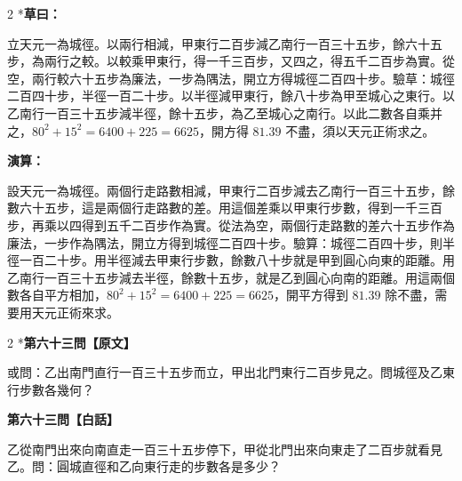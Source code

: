 \documentclass[11pt,a4paper]{article}
\begin{document}
\begin{paracol}{2}
\switchcolumn[0]*\textbf{草曰：}

\small 立天元一為城徑。以兩行相減，甲東行二百步減乙南行一百三十五步，餘六十五步，為兩行之較。以較乘甲東行，得一千三百步，又四之，得五千二百步為實。從空，兩行較六十五步為廉法，一步為隅法，開立方得城徑二百四十步。驗草：城徑二百四十步，半徑一百二十步。以半徑減甲東行，餘八十步為甲至城心之東行。以乙南行一百三十五步減半徑，餘十五步，為乙至城心之南行。以此二數各自乘并之，$80^2 + 15^2 = 6400 + 225 = 6625$，開方得 $81.39$ 不盡，須以天元正術求之。

\switchcolumn\textbf{演算：}

\small 設天元一為城徑。兩個行走路數相減，甲東行二百步減去乙南行一百三十五步，餘數六十五步，這是兩個行走路數的差。用這個差乘以甲東行步數，得到一千三百步，再乘以四得到五千二百步作為實。從法為空，兩個行走路數的差六十五步作為廉法，一步作為隅法，開立方得到城徑二百四十步。驗算：城徑二百四十步，則半徑一百二十步。用半徑減去甲東行步數，餘數八十步就是甲到圓心向東的距離。用乙南行一百三十五步減去半徑，餘數十五步，就是乙到圓心向南的距離。用這兩個數各自平方相加，$80^2 + 15^2 = 6400 + 225 = 6625$，開平方得到 $81.39$ 除不盡，需要用天元正術來求。
\end{paracol}

\vspace{0.1cm}
\noindent{}
\par\vspace{0.3cm}

\begin{paracol}{2}
\switchcolumn[0]*\noindent\textbf{第六十三問【原文】}

\small 或問：乙出南門直行一百三十五步而立，甲出北門東行二百步見之。問城徑及乙東行步數各幾何？

\switchcolumn\noindent\textbf{第六十三問【白話】}

\small 乙從南門出來向南直走一百三十五步停下，甲從北門出來向東走了二百步就看見乙。問：圓城直徑和乙向東行走的步數各是多少？
\end{paracol}

\vspace{0.1cm}
\noindent{}
\par\vspace{0.15cm}
\end{document}
